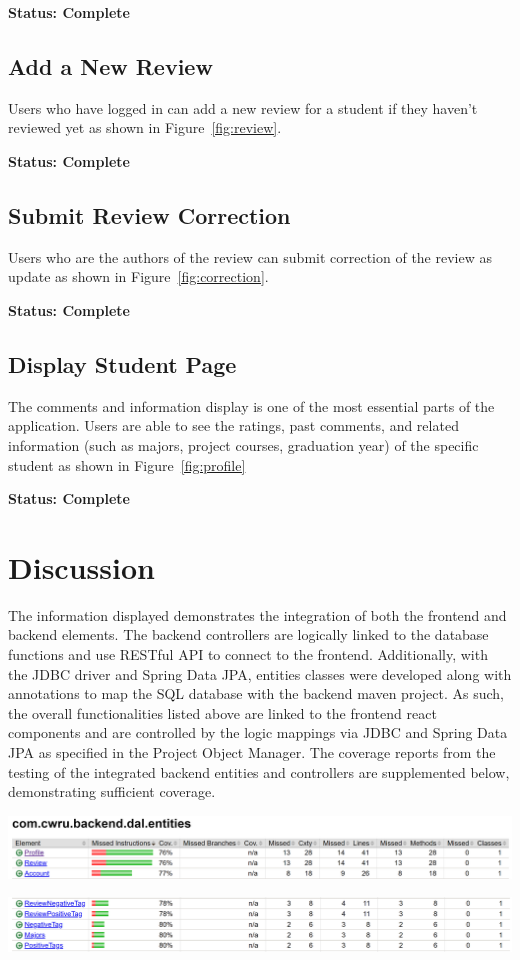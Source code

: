 \documentclass[12pt]{article}
\begin{document}
\textbf{Status: Complete}

\subsection{Add a New Review}
Users who have logged in can add a new review for a student if they haven't reviewed yet as shown in Figure~\ref{fig:review}.

\textbf{Status: Complete}

\subsection{Submit Review Correction}
Users who are the authors of the review can submit correction of the review as update as shown in Figure~\ref{fig:correction}.

\textbf{Status: Complete}

\subsection{Display Student Page}
The comments and information display is one of the most essential parts of the application. 
Users are able to see the ratings, past comments, and related information 
(such as majors, project courses, graduation year) of the specific student as shown in Figure~\ref{fig:profile}

\textbf{Status: Complete}

\section{Discussion}

The information displayed demonstrates the integration of both the frontend and backend elements. The backend controllers are logically linked to the database functions and use RESTful API to connect to the frontend. Additionally, with the JDBC driver and Spring Data JPA, entities classes were developed along with annotations to map the SQL database with the backend maven project. As such, the overall functionalities listed above are linked to the frontend react components and are controlled by the logic mappings via JDBC and Spring Data JPA as specified in the Project Object Manager. The coverage reports from the testing of the integrated backend entities and controllers are supplemented below, demonstrating sufficient coverage.
\begin{center}
    \includegraphics[scale = 0.3]{first.png}
\end{center}
\begin{center}
    \includegraphics[scale = 0.3]{second.png}
\end{center}
\end{document}
